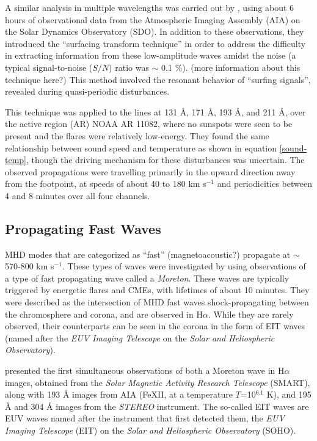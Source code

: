 \documentclass[preprint2]{aastex}
\begin{document}
A similar analysis in multiple wavelengths was carried out by
\cite{pac_2}, using about 6 hours of observational data from the
Atmospheric Imaging Assembly (AIA) on the Solar Dynamics Observatory (SDO).
In addition to these observations, they introduced the
``surfacing transform technique''
in order to address the difficulty in extracting information from these
low-amplitude waves amidst the noise (a typical signal-to-noise
($S/N$) ratio was $\sim$ 0.1 \%). (more information about this
technique here?)
This method involved the resonant behavior of ``surfing signals'',
revealed during quasi-periodic disturbances.

This technique was applied to the lines at
131 \AA{}, 171 \AA{}, 193 \AA{}, and 211 \AA{},
over the active region (AR) NOAA AR 11082, where no sunspots were seen
to be present and the flares were relatively low-energy.
They found the same relationship between sound speed and temperature
as shown in equation \ref{sound-temp}, though the driving mechanism
for these disturbances was uncertain. The observed propagations were
travelling primarily in the upward direction away from the footpoint,
at speeds of about 40 to 180 km s$^{-1}$ and periodicities between 4
and 8 minutes over all four channels.


\subsection{Propagating Fast Waves}
MHD modes that are categorized as ``fast'' (magnetoacoustic?) propagate
at $\sim$ 570-800 km s$^{-1}$. These types of waves were investigated by
\cite{pfw_1} using observations of a type of fast propagating wave called a
\emph{Moreton}. These waves are
typically triggered by energetic flares and CMEs, with lifetimes of
about 10 minutes.
They were described as the intersection of MHD fast waves shock-propagating
between the chromosphere and corona, and are observed in H$\alpha$.
While they are rarely observed, their
counterparts can be seen in the corona in the form of EIT waves
(named after the \emph{EUV Imaging Telescope} on the
\emph{Solar and Heliospheric Observatory}).

\cite{pfw_1} presented the first simultaneous observations of both
a Moreton wave in H$\alpha$ images, obtained from the
\emph{Solar Magnetic Activity Research Telescope} (SMART),
along with 193 \AA{} images from AIA
(Fe{\footnotesize XII}, at a temperature $T$=10$^{6.1}$ K),
and 195 \AA{} and 304 \AA{} images from the
\emph{STEREO} instrument.
The so-called {EIT} waves are EUV waves
named after the instrument that first detected them,
the \emph{EUV Imaging Telescope} (EIT) on the
\emph{Solar and Heliospheric Observatory} (SOHO).
\end{document}
